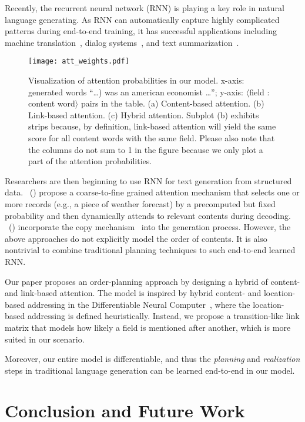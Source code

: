\documentclass[letterpaper]{article} %
\newcommand{\newcite}[1]{\citeauthor{#1}~(\citeyear{#1})}
\begin{document}
Recently, the recurrent neural network (RNN) is playing a key role in natural language generating. As RNN can automatically capture highly complicated patterns during end-to-end training, it has successful applications including machine translation~\cite{attention}, dialog systems~\cite{dialog}, and text summarization~\cite{summarization}.
\begin{figure}[!t]
	\centering
	\texttt{[image: att\_weights.pdf]}
	\vspace{-.7cm}
	\caption{Visualization of attention probabilities in our model. x-axis: generated words ``\dots ) was an american economist \dots ''; y-axis: $\langle$field : content word$\rangle$ pairs in the table. (a) Content-based attention.  (b) Link-based attention. (c) Hybrid attention. Subplot (b) exhibits strips because, by definition, link-based attention will yield the same score for all content words with the same field. Please also note that the columns do not sum to 1 in the figure because we only plot a part of the attention probabilities.}
	\vspace{-.2cm}
	\label{fig:vis}
\end{figure}

Researchers are then beginning to use RNN for text generation from structured data. \newcite{mei} propose a coarse-to-fine grained attention mechanism that selects one or more records (e.g., a piece of weather forecast) by a precomputed but fixed probability and then dynamically attends to relevant contents during decoding. \newcite{wikibio} incorporate the copy mechanism~\cite{copynet} into the generation process. However, the above approaches do not explicitly model the order of contents. It is also nontrivial to combine traditional planning techniques to such end-to-end learned RNN.

Our paper proposes an order-planning approach by designing a hybrid of content- and link-based attention. The model is inspired by hybrid content- and location-based addressing in the Differentiable Neural Computer~\cite[DNC]{DNC}, where the location-based addressing is defined heuristically. Instead, we propose a transition-like link matrix that models how likely a field is mentioned after another, which is more suited in our scenario.

Moreover, our entire model is differentiable, and thus the \textit{planning} and \textit{realization} steps in traditional language generation can be learned end-to-end in our model.


\section{Conclusion and Future Work}
\end{document}
